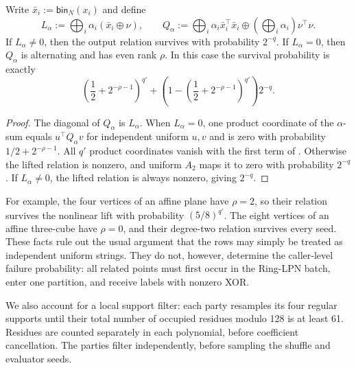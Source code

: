 \begin{lemma}\label{lem:rc-relation-survival}
Write $\bar x_i:=\mathsf{bin}_N(x_i)$ and define
\[
 L_\alpha:=\bigoplus_i\alpha_i(\bar x_i\oplus\nu),
 \qquad
 Q_\alpha:=\bigoplus_i\alpha_i\bar x_i^\top\bar x_i
       \oplus\left(\bigoplus_i\alpha_i\right)\nu^\top\nu.
\]
If $L_\alpha\neq0$, then the output relation survives with probability
$2^{-q}$.  If $L_\alpha=0$, then $Q_\alpha$ is alternating and has even rank
$\rho$.  In this case the survival probability is exactly
\begin{equation}\label{eq:rc-relation-survival}
 \left(\frac12+2^{-\rho-1}\right)^{q'}
 +\left(1-\left(\frac12+2^{-\rho-1}\right)^{q'}\right)2^{-q}.
\end{equation}
\end{lemma}
\begin{proof}
The diagonal of $Q_\alpha$ is $L_\alpha$.  When $L_\alpha=0$, one product
coordinate of the $\alpha$-sum equals $u^\top Q_\alpha v$ for independent
uniform $u,v$ and is zero with probability
$1/2+2^{-\rho-1}$.  All $q'$ product coordinates vanish with the first term
of .  Otherwise the lifted relation is
nonzero, and uniform $A_2$ maps it to zero with probability $2^{-q}$.  If
$L_\alpha\neq0$, the lifted relation is always nonzero, giving $2^{-q}$.
\end{proof}

For example, the four vertices of an affine plane have $\rho=2$, so their
relation survives the nonlinear lift with probability $(5/8)^{q'}$.  The
eight vertices of an affine three-cube have $\rho=0$, and their degree-two
relation survives every seed.  These facts rule out the usual argument that
the rows may simply be treated as independent uniform strings.  They do not,
however, determine the caller-level failure probability: all related points
must first occur in the Ring-LPN batch, enter one partition, and receive
labels with nonzero XOR.

We also account for a local support filter: each party resamples its four
regular supports until their total number of occupied residues modulo 128
is at least 61.  Residues are counted separately in each polynomial, before
coefficient cancellation.  The parties filter independently, before sampling
the shuffle and evaluator seeds.

